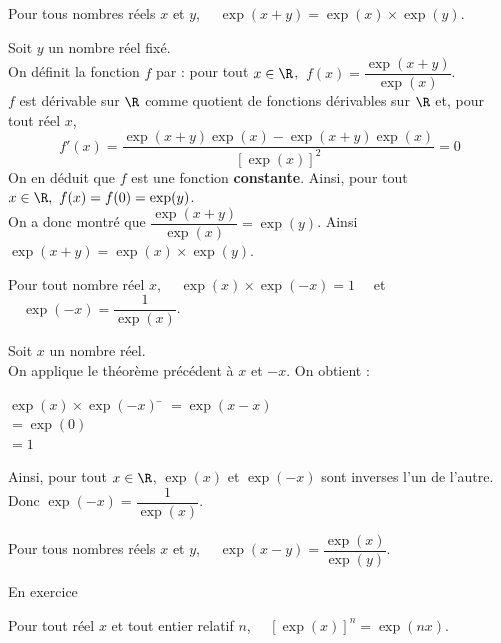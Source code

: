 \documentclass[a4paper,11pt,cours]{nsi} %
\begin{document}
\begin{propriete}
	Pour tous nombres réels $x$ et $y$, $\quad \boxed{\exp(x+y)=\exp(x)\times \exp(y)}$.
\end{propriete}
\begin{demonstration}
	Soit $y$ un nombre réel fixé.\\
	On définit la fonction $f$ par : pour tout $x\in \R$, $\ f(x)=\dfrac{\exp(x+y)}{\exp(x)}$.\\
	$f$ est dérivable sur $\R$ comme quotient de fonctions dérivables sur $\R$ et, pour tout réel $x$, $$f'(x)=\dfrac{\exp(x+y)\exp(x)-\exp(x+y)\exp(x)}{\left[\exp(x)\right]^2}=0$$
	On en déduit que $f$ est une fonction \textbf{constante}. Ainsi, pour tout $x\in \R, \ f(x)=f(0)=\exp(y)$.\\
	On a donc montré que $\dfrac{\exp(x+y)}{\exp(x)}=\exp(y)$. Ainsi $\exp(x+y)=\exp(x)\times\exp(y)$.
\end{demonstration}

\begin{propriete}[ ]
	Pour tout nombre réel $x$, $\quad \exp(x)\times \exp(-x)=1 \quad$ et $\quad \exp(-x)=\dfrac{1}{\exp(x)}$.
\end{propriete}
\begin{demonstration}
	Soit $x$ un nombre réel.\\
	On applique le théorème précédent à $x$ et $-x$. On obtient :
	\begin{tabbing}
		$\exp(x)\times \exp(-x)$ \= $=\exp(x-x)$\\
		\>	$=\exp(0)$\\
		\>	$=1$
	\end{tabbing}
	Ainsi, pour tout $x\in \R$, $\exp(x)$ et $\exp(-x)$ sont inverses l'un de l'autre. Donc $\exp(-x)=\dfrac{1}{\exp(x)}$.
\end{demonstration}

\begin{propriete}[]
	Pour tous nombres réels $x$ et $y$, $\quad\exp(x-y)=\dfrac{\exp(x)}{\exp(y)}$.
\end{propriete}


\begin{demonstration}
	En exercice
\end{demonstration}

\begin{propriete}[ (admise)]
	Pour tout réel $x$ et tout entier relatif $n$, $\quad \boxed{\left[\exp(x)\right]^n=\exp(nx)}$.
\end{propriete}
\end{document}
